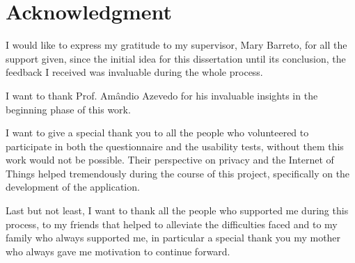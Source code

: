 %
%
\chapter*{Acknowledgment}

I would like to express my gratitude to my supervisor, Mary Barreto, for
all the support given, since the initial idea for this dissertation until its conclusion,
the feedback I received was invaluable during the whole process.

I want to thank Prof. Amândio Azevedo for his invaluable insights in the beginning phase of
this work.

I want to give a special thank you to all the people who volunteered to
participate in both the questionnaire and the usability tests, without them this work
would not be possible. Their perspective on privacy and the Internet of Things helped
tremendously during the course of this project, specifically on the development of the application.

Last but not least, I want to thank all the people who supported me during this
process, to my friends that helped to alleviate the difficulties faced and
to my family who always supported me, in particular a special thank you my mother
who always gave me motivation to continue forward.
